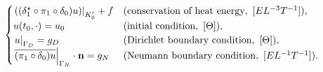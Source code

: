 \begin{formulation}
\begin{equation}
\begin{split}
\begin{cases}
        \restrict{((\delta_1^\star \circ \pi_1 \circ \delta_0) u)}{K'_0} + f
        & (\text{conservation of heat energy},\ [E L^{-3} T^{-1}]), \\
%
        u(t_0, \cdot) = u_0
        & (\text{initial condition},\ [\Theta]), \\
%
        \restrict{u}{\Gamma_D} = g_D
        & (\text{Dirichlet boundary condition},\ [\Theta]), \\
%
        \restrict{\overline{(\pi_1 \circ \delta_0) u}}{\Gamma_N}
        \cdot {\bf n} = g_N
        & (\text{Neumann boundary condition},\ [E L^{-1} T^{-1}]).
      \end{cases}
    \end{split}
  \end{equation}
\end{formulation}
